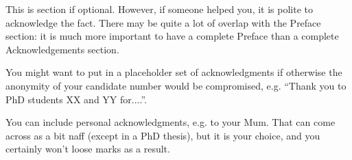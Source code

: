 
This is section if optional. However, if someone helped you, it is polite to acknowledge the fact. There may be quite a lot of overlap with the Preface section: it is much more important to have a complete Preface than a complete Acknowledgements section. 

You might want to put in a placeholder set of acknowledgments if otherwise the anonymity of your candidate number would be compromised, e.g. ``Thank you to PhD students XX and YY for....''.

You can include personal acknowledgments, e.g. to your Mum. That can come across as a bit naff (except in a PhD thesis), but it is your choice, and you certainly won't loose marks as a result.